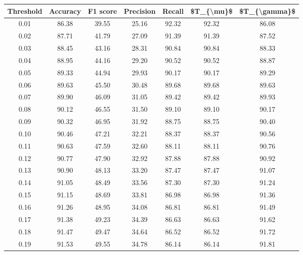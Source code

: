 \begin{tabular}{|c|c|c|c|c|c|c|}
\hline
 Threshold &  Accuracy &  F1 score &  Precision &  Recall &  \$T\_\{\textbackslash mu\}\$ &  \$T\_\{\textbackslash gamma\}\$ \\
\hline
      0.01 &     86.38 &     39.55 &      25.16 &   92.32 &      92.32 &         86.08 \\
      0.02 &     87.71 &     41.79 &      27.09 &   91.39 &      91.39 &         87.52 \\
      0.03 &     88.45 &     43.16 &      28.31 &   90.84 &      90.84 &         88.33 \\
      0.04 &     88.95 &     44.16 &      29.20 &   90.52 &      90.52 &         88.87 \\
      0.05 &     89.33 &     44.94 &      29.93 &   90.17 &      90.17 &         89.29 \\
      0.06 &     89.63 &     45.50 &      30.48 &   89.68 &      89.68 &         89.63 \\
      0.07 &     89.90 &     46.09 &      31.05 &   89.42 &      89.42 &         89.93 \\
      0.08 &     90.12 &     46.55 &      31.50 &   89.10 &      89.10 &         90.17 \\
      0.09 &     90.32 &     46.95 &      31.92 &   88.75 &      88.75 &         90.40 \\
      0.10 &     90.46 &     47.21 &      32.21 &   88.37 &      88.37 &         90.56 \\
      0.11 &     90.63 &     47.59 &      32.60 &   88.11 &      88.11 &         90.76 \\
      0.12 &     90.77 &     47.90 &      32.92 &   87.88 &      87.88 &         90.92 \\
      0.13 &     90.90 &     48.13 &      33.20 &   87.47 &      87.47 &         91.07 \\
      0.14 &     91.05 &     48.49 &      33.56 &   87.30 &      87.30 &         91.24 \\
      0.15 &     91.15 &     48.69 &      33.81 &   86.98 &      86.98 &         91.36 \\
      0.16 &     91.26 &     48.95 &      34.08 &   86.81 &      86.81 &         91.49 \\
      0.17 &     91.38 &     49.23 &      34.39 &   86.63 &      86.63 &         91.62 \\
      0.18 &     91.47 &     49.47 &      34.64 &   86.52 &      86.52 &         91.72 \\
      0.19 &     91.53 &     49.55 &      34.78 &   86.14 &      86.14 &         91.81 \\

\end{tabular}
